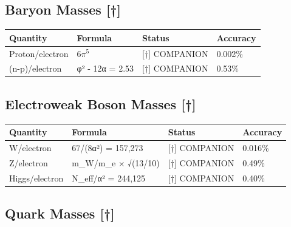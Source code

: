 \documentclass[
  11pt,
  letterpaper,
  twoside,
  openany]{book}
\makeatletter
\let\orig@subsection\subsection
\renewcommand{\subsection}{\needspace{6\baselineskip}\orig@subsection}
\makeatother
\begin{document}
\subsection{Baryon Masses {[}†{]}}\label{baryon-masses-1}

\begin{longtable}[]{@{}llll@{}}
\toprule\noalign{}
Quantity & Formula & Status & Accuracy \\
\midrule\noalign{}
\endhead
\bottomrule\noalign{}
\endlastfoot
Proton/electron & \(6\pi^5\) & {[}†{]} COMPANION & 0.002\% \\
(n-p)/electron & φ² - 12α = 2.53 & {[}†{]} COMPANION & 0.53\% \\
\end{longtable}

\subsection{Electroweak Boson Masses
{[}†{]}}\label{electroweak-boson-masses}

\begin{longtable}[]{@{}llll@{}}
\toprule\noalign{}
Quantity & Formula & Status & Accuracy \\
\midrule\noalign{}
\endhead
\bottomrule\noalign{}
\endlastfoot
W/electron & 67/(8α²) = 157,273 & {[}†{]} COMPANION & 0.016\% \\
Z/electron & m\_W/m\_e × √(13/10) & {[}†{]} COMPANION & 0.49\% \\
Higgs/electron & N\_eff/α² = 244,125 & {[}†{]} COMPANION & 0.40\% \\
\end{longtable}

\subsection{Quark Masses {[}†{]}}\label{quark-masses}
\end{document}
